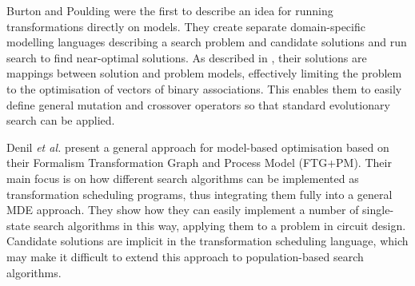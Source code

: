 			Burton and Poulding \cite{BurtonPoulding13} were the first to describe an idea for running transformations directly on models. They create separate 
			domain-specific modelling languages describing a search problem and candidate solutions and run search to find near-optimal solutions. As described in 
			\cite{Burton+12}, their solutions are mappings between solution and problem models, effectively limiting the problem to the optimisation of vectors of
			binary associations. This enables them to easily define general mutation and crossover operators so that standard evolutionary search can be applied.
			
			Denil \emph{et al.} \cite{Denil+14} present a general approach for model-based optimisation based on their Formalism Transformation Graph and Process Model 
			(FTG+PM). Their main focus is on how different search algorithms can be implemented as transformation scheduling programs, thus integrating them fully into
			a general MDE approach. They show how they can easily implement a number of single-state search algorithms in this way, applying them to a problem in
			circuit design. Candidate solutions are implicit in the transformation scheduling language, which may make it difficult to extend this approach to 
			population-based search algorithms.